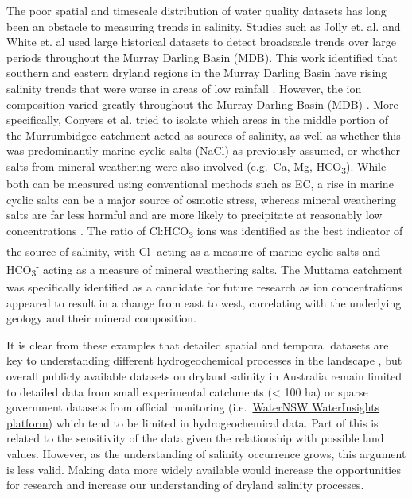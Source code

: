 \documentclass[, manuscript]{copernicus}
\begin{document}
The poor spatial and timescale distribution of water quality datasets
has long been an obstacle to measuring trends in salinity. Studies such
as Jolly et. al. \citeyearpar{Jolly2001} and White et. al
\citeyearpar{White2009} used large historical datasets to detect
broadscale trends over large periods throughout the Murray Darling Basin
(MDB). This work identified that southern and eastern dryland regions in
the Murray Darling Basin have rising salinity trends that were worse in
areas of low rainfall \citep{White2009, Jolly2001}. However, the ion
composition varied greatly throughout the Murray Darling Basin (MDB)
\citep{White2009}. More specifically, Conyers et al.
\citeyearpar{Conyers2008} tried to isolate which areas in the middle
portion of the Murrumbidgee catchment acted as sources of salinity, as
well as whether this was predominantly marine cyclic salts (NaCl) as
previously assumed, or whether salts from mineral weathering were also
involved (e.g.~Ca, Mg, HCO\textsubscript{3}). While both can be measured
using conventional methods such as EC, a rise in marine cyclic salts can
be a major source of osmotic stress, whereas mineral weathering salts
are far less harmful and are more likely to precipitate at reasonably
low concentrations \citep{Conyers2008}. The ratio of
Cl:HCO\textsubscript{3} ions was identified as the best indicator of the
source of salinity, with Cl\textsuperscript{-} acting as a measure of
marine cyclic salts and HCO\textsubscript{3}\textsuperscript{-} acting
as a measure of mineral weathering salts. The Muttama catchment was
specifically identified as a candidate for future research as ion
concentrations appeared to result in a change from east to west,
correlating with the underlying geology and their mineral composition.

It is clear from these examples that detailed spatial and temporal
datasets are key to understanding different hydrogeochemical processes
in the landscape \citep[e.g.][]{Cartwright2010, Dalhaus2010}, but
overall publicly available datasets on dryland salinity in Australia
remain limited to detailed data from small experimental catchments
(\textless{} 100 ha) \citep{Summerell2006, Hughes2007} or sparse
government datasets from official monitoring
(i.e.~\href{https://waterinsights.waternsw.com.au/}{WaterNSW
WaterInsights platform}) which tend to be limited in hydrogeochemical
data. Part of this is related to the sensitivity of the data given the
relationship with possible land values. However, as the understanding of
salinity occurrence grows, this argument is less valid. Making data more
widely available would increase the opportunities for research and
increase our understanding of dryland salinity processes.
\end{document}
